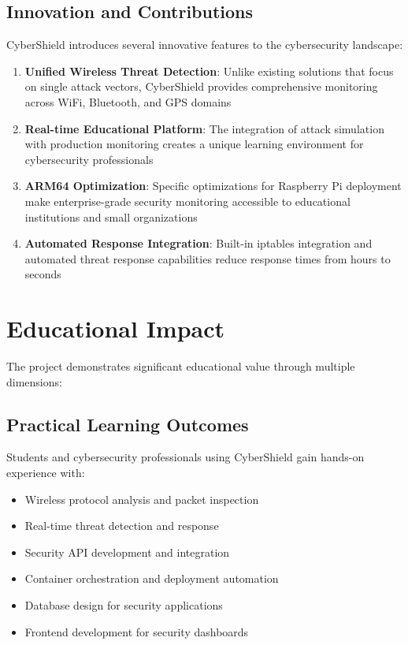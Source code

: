 \documentclass[12pt,a4paper]{report}
\begin{document}
\subsection{Innovation and Contributions}

CyberShield introduces several innovative features to the cybersecurity landscape:

\begin{enumerate}
    \item \textbf{Unified Wireless Threat Detection}: Unlike existing solutions that focus on single attack vectors, CyberShield provides comprehensive monitoring across WiFi, Bluetooth, and GPS domains
    \item \textbf{Real-time Educational Platform}: The integration of attack simulation with production monitoring creates a unique learning environment for cybersecurity professionals
    \item \textbf{ARM64 Optimization}: Specific optimizations for Raspberry Pi deployment make enterprise-grade security monitoring accessible to educational institutions and small organizations
    \item \textbf{Automated Response Integration}: Built-in iptables integration and automated threat response capabilities reduce response times from hours to seconds
\end{enumerate}

\section{Educational Impact}

The project demonstrates significant educational value through multiple dimensions:

\subsection{Practical Learning Outcomes}

Students and cybersecurity professionals using CyberShield gain hands-on experience with:
\begin{itemize}
    \item Wireless protocol analysis and packet inspection
    \item Real-time threat detection and response
    \item Security API development and integration
    \item Container orchestration and deployment automation
    \item Database design for security applications
    \item Frontend development for security dashboards
\end{itemize}
\end{document}
